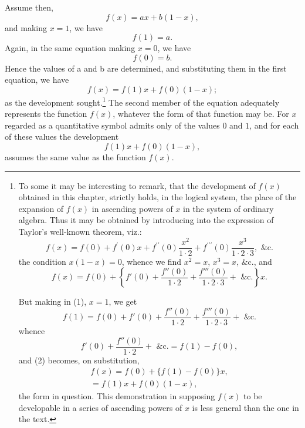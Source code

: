 \documentclass[oneside]{book}
\begin{document}
Assume then,
\[
f\left(x\right) = ax + b \left(1 - x\right),
\]
and making $x = 1$, we have
\[
f\left(1\right) = a.
\]
Again, in the same equation making $x = 0$, we have
\[
f\left(0\right) = b.
\]
Hence the values of a and b are determined, and substituting
them in the first equation, we have
\begin{equation}
f\left(x\right) = f\left(1\right) x + f\left(0\right)\left(1-x\right);
\end{equation}
as the development sought.\footnote{
To some it may be interesting to remark, that the development of $f\left(x\right)$
obtained in this chapter, strictly holds, in the logical system, the place of the
expansion of $f\left(x\right)$ in ascending powers of $x$ in the system of ordinary algebra.
Thus it may be obtained by introducing into the expression of Taylor's well-known
theorem, viz.: %
\setcounter{equation}{0}
\begin{equation}
f\left(x\right) = f\left(0\right)%
                + f^{\prime}\left(0\right)x%
                + f^{\prime\prime}\left(0\right)\frac{x^2}{1\cdot{}2}%
                + f^{\prime\prime\prime}\left(0\right)\frac{x^3}{1\cdot2\cdot3}, \textrm{ \&c.}
\end{equation}
the condition $x (1 - x) = 0$, whence we find $x^2 = x$, $x^3 = x$, \&c., and
\begin{equation}
f\left(x\right) = f\left(0\right) + \left\{f' \left(0\right) + \frac{f'' \left(0\right)}{1 \cdot 2} +
\frac{f''' \left(0\right)}{1 \cdot 2 \cdot 3} + \textrm{ \&c.}\right\} x.
\end{equation}

But making in (1), $x=1$, we get
\[
f(1) = f(0) + f'(0) + \frac{f''(0)}{1 \cdot 2} +
\frac{f'''(0)}{1 \cdot 2 \cdot 3} + \textrm{ \&c.}
\]
whence
\[
f'(0) + \frac{f''(0)}{1 \cdot 2} + \textrm{ \&c.} = f(1) - f(0),
\]
and (2) becomes, on substitution,
\begin{eqnarray*}
f(x) = f(0) + \{f(1)-f(0)\} x,\\
= f(1)x + f(0)(1-x),
\end{eqnarray*}
the form in question. This demonstration in supposing $f\left(x\right)$ to be developable in
a series of ascending powers of $x$ is less general than the one in the text.}
The second member of the equation
adequately represents the function $f\left(x\right)$, whatever the form
of that function may be. For $x$ regarded as a quantitative symbol admits
only of the values $0$ and $1$, and for each of these
values the development
\[
f\left(1\right)x + f\left(0\right) \left(1-x\right),
\]
assumes the same value as the function $f\left(x\right)$.
\end{document}
